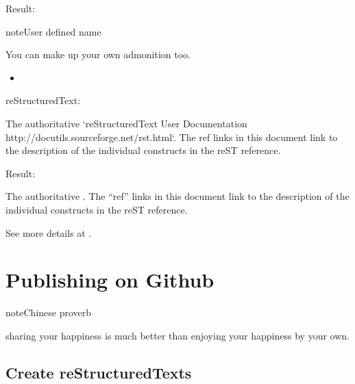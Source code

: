 \documentclass[letterpaper,11pt,english]{sphinxmanual}
\begin{document}
Result:

\begin{sphinxadmonition}{note}{User defined name}

You can make up your own admonition too.
\end{sphinxadmonition}
\begin{itemize}
\item {} 

\end{itemize}

reStructuredText:

\begin{sphinxVerbatim}[commandchars=\\\{\}]
 

   The authoritative {}`reStructuredText User Documentation
   \PYGZlt{}http://docutils.sourceforge.net/rst.html\PYGZgt{}{}`\PYGZus{}.  The \PYGZdq{}ref\PYGZdq{} links in this
   document link to the description of the individual constructs in the reST
   reference.
\end{sphinxVerbatim}

Result:




The authoritative .  The “ref” links in this
document link to the description of the individual constructs in the reST
reference.



See more details at .


\chapter{Publishing on Github}
\label{\detokenize{github:publishing-on-github}}\label{\detokenize{github:github}}\label{\detokenize{github::doc}}
\begin{sphinxadmonition}{note}{Chinese proverb}

sharing your happiness is much better than enjoying your happiness by your own.
\end{sphinxadmonition}


\section{Create reStructuredTexts}
\label{\detokenize{github:create-rests}}
\end{document}
